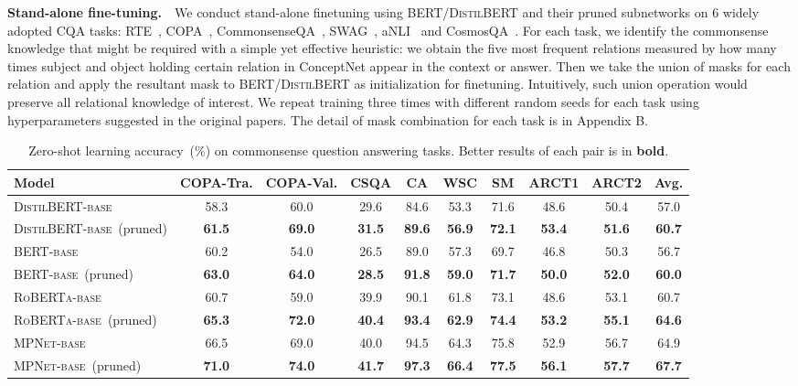 \textbf{Stand-alone fine-tuning.}~~We conduct stand-alone finetuning using \textsc{BERT}/\textsc{DistilBERT} and their pruned subnetworks on $6$ widely adopted CQA tasks: RTE~\citep{CambridgeJournals:6906264}, COPA~\citep{roemmele_choice_2011}, CommonsenseQA~\citep{talmor-etal-2019-commonsenseqa}, SWAG~\citep{zellers-etal-2018-swag},   aNLI~\citep{DBLP:journals/corr/abs-1908-05739} and CosmosQA~\citep{huang-etal-2019-cosmos}. For each task, we identify the commonsense knowledge that might be required with a simple yet effective heuristic: we obtain the five most frequent relations measured by how many times subject and object holding certain relation in ConceptNet appear in the context or answer. Then we take the union of masks for each relation and apply the resultant mask to \textsc{BERT}/\textsc{DistilBERT} as initialization for finetuning. Intuitively, such union operation would preserve all relational knowledge of interest.
We repeat training three times with different random seeds for each task using hyperparameters suggested in the original papers.
The  detail of mask combination for each task is in Appendix B.

\begin{table}[t!]
	\centering
	\scriptsize
	\begin{tabular}{l|cccccccc|c}
		\toprule
		\textbf{Model} &COPA-Tra. &COPA-Val. &CSQA &CA &WSC  &SM &ARCT1 &ARCT2 &Avg. \\
		\midrule
		\textsc{DistilBERT-base} &58.3 &60.0 &29.6 &84.6 &53.3  &71.6 &48.6 &50.4  &57.0  \\
		\textsc{DistilBERT-base}~(pruned) &\textbf{61.5} &\textbf{69.0} &\textbf{31.5} &\textbf{89.6} &\textbf{56.9}  &\textbf{72.1} &\textbf{53.4} &\textbf{51.6} & \textbf{60.7} \\
		\midrule
		\textsc{BERT-base} &60.2 &54.0 &26.5 &89.0 &57.3  &69.7 &46.8 &50.3 &56.7 \\
		\textsc{BERT-base}~(pruned) &\textbf{63.0} &\textbf{64.0} &\textbf{28.5} &\textbf{91.8} &\textbf{59.0}  &\textbf{71.7} &\textbf{50.0} &\textbf{52.0}  & \textbf{60.0}\\
		\midrule
		\textsc{RoBERTa-base} &60.7 &59.0 &39.9 &90.1 &61.8  &73.1 &48.6 &53.1 &60.7 \\
		\textsc{RoBERTa-base}~(pruned) &\textbf{65.3} &\textbf{72.0} &\textbf{40.4} &\textbf{93.4} &\textbf{62.9}  &\textbf{74.4} &\textbf{53.2} &\textbf{55.1} &\textbf{64.6}\\
		\midrule
		\textsc{MPNet-base} &66.5 &69.0 &40.0 &94.5 &64.3&75.8  &52.9 &56.7 &64.9  \\
		\textsc{MPNet-base}~(pruned) &\textbf{71.0} &\textbf{74.0} &\textbf{41.7} &\textbf{97.3} &\textbf{66.4}  &\textbf{77.5} &\textbf{56.1} &\textbf{57.7}  & \textbf{67.7}\\
		\bottomrule
	\end{tabular}
	\caption{Zero-shot learning accuracy~(\%) on commonsense question answering tasks. Better results of each pair is in \textbf{bold}.}
	\label{table:zeroshot}
\end{table}

